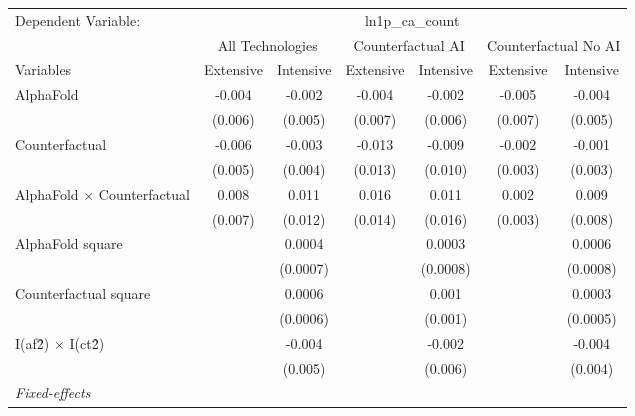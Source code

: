 \begingroup
\centering
\begin{tabular}{lcccccc}
   \tabularnewline \midrule \midrule
   Dependent Variable: & \multicolumn{6}{c}{ln1p\_ca\_count}\\
 & \multicolumn{2}{c}{All Technologies} & \multicolumn{2}{c}{Counterfactual AI} & \multicolumn{2}{c}{Counterfactual No AI} \\
\cmidrule(lr){1-1}\cmidrule(lr){2-3} \cmidrule(lr){4-5} \cmidrule(lr){6-7}
Variables & \multicolumn{1}{c}{Extensive} & \multicolumn{1}{c}{Intensive} & \multicolumn{1}{c}{Extensive} & \multicolumn{1}{c}{Intensive} & \multicolumn{1}{c}{Extensive} & \multicolumn{1}{c}{Intensive} \\
\cmidrule(lr){1-1}\cmidrule(lr){2-2} \cmidrule(lr){3-3} \cmidrule(lr){4-4} \cmidrule(lr){5-5} \cmidrule(lr){6-6} \cmidrule(lr){7-7}
   AlphaFold                          & -0.004  & -0.002   & -0.004  & -0.002   & -0.005  & -0.004\\   
                                      & (0.006) & (0.005)  & (0.007) & (0.006)  & (0.007) & (0.005)\\   
   Counterfactual                     & -0.006  & -0.003   & -0.013  & -0.009   & -0.002  & -0.001\\   
                                      & (0.005) & (0.004)  & (0.013) & (0.010)  & (0.003) & (0.003)\\   
   AlphaFold $\times$ Counterfactual  & 0.008   & 0.011    & 0.016   & 0.011    & 0.002   & 0.009\\   
                                      & (0.007) & (0.012)  & (0.014) & (0.016)  & (0.003) & (0.008)\\   
   AlphaFold square                   &         & 0.0004   &         & 0.0003   &         & 0.0006\\   
                                      &         & (0.0007) &         & (0.0008) &         & (0.0008)\\   
   Counterfactual square              &         & 0.0006   &         & 0.001    &         & 0.0003\\   
                                      &         & (0.0006) &         & (0.001)  &         & (0.0005)\\   
   I(af\^2) $\times$ I(ct\^2)         &         & -0.004   &         & -0.002   &         & -0.004\\   
                                      &         & (0.005)  &         & (0.006)  &         & (0.004)\\   
   \midrule
   \emph{Fixed-effects}\\

\end{tabular}
